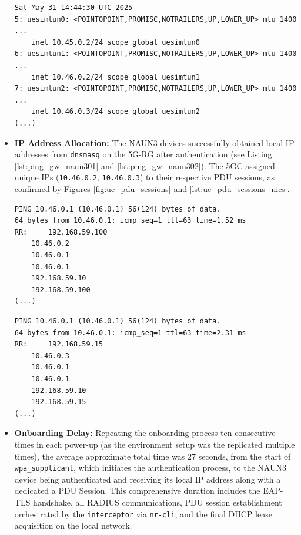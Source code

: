 \begin{itemize}
\begin{lstlisting}[caption=Network interfaces created by UERANSIM to bind to \acs{PDU} Sessions,label={lst:ue_pdu_sessions_nics}]
Sat May 31 14:44:30 UTC 2025
5: uesimtun0: <POINTOPOINT,PROMISC,NOTRAILERS,UP,LOWER_UP> mtu 1400 ...
    inet 10.45.0.2/24 scope global uesimtun0
6: uesimtun1: <POINTOPOINT,PROMISC,NOTRAILERS,UP,LOWER_UP> mtu 1400 ...
    inet 10.46.0.2/24 scope global uesimtun1
7: uesimtun2: <POINTOPOINT,PROMISC,NOTRAILERS,UP,LOWER_UP> mtu 1400 ...
    inet 10.46.0.3/24 scope global uesimtun2
(...)
\end{lstlisting}

    \item \textbf{\ac{IP} Address Allocation:} The \ac{NAUN3} devices successfully obtained local \ac{IP} addresses from \texttt{dnsmasq} on the \ac{5G-RG} after authentication (see Listing \ref{lst:ping_gw_naun301} and \ref{lst:ping_gw_naun302}). The \ac{5GC} assigned unique \acp{IP} (\texttt{10.46.0.2}, \texttt{10.46.0.3}) to their respective \ac{PDU} sessions, as confirmed by Figures \ref{fig:ue_pdu_sessions} and \ref{lst:ue_pdu_sessions_nics}.

\begin{lstlisting}[caption=\texttt{naun301} \texttt{ping -R} displaying route to the \acs{5GC},label={lst:ping_gw_naun301}]
PING 10.46.0.1 (10.46.0.1) 56(124) bytes of data.
64 bytes from 10.46.0.1: icmp_seq=1 ttl=63 time=1.52 ms
RR: 	192.168.59.100
    10.46.0.2
    10.46.0.1
    10.46.0.1
    192.168.59.10
    192.168.59.100
(...)
\end{lstlisting}

\begin{lstlisting}[caption=\texttt{naun3012} \texttt{ping -R} displaying route to the \acs{5GC},label={lst:ping_gw_naun302}]
PING 10.46.0.1 (10.46.0.1) 56(124) bytes of data.
64 bytes from 10.46.0.1: icmp_seq=1 ttl=63 time=2.31 ms
RR: 	192.168.59.15
    10.46.0.3
    10.46.0.1
    10.46.0.1
    192.168.59.10
    192.168.59.15
(...)
\end{lstlisting}

    \item \textbf{Onboarding Delay:} Repeating the onboarding process ten consecutive times in each power-up (as the environment setup was the replicated multiple times), the average approximate total time was 27 seconds, from the start of \texttt{wpa\_supplicant}, which initiates the authentication process, to the \ac{NAUN3} device being authenticated and receiving its local \ac{IP} address along with a dedicated a \ac{PDU} Session. This comprehensive duration includes the \ac{EAP-TLS} handshake, all \ac{RADIUS} communications, \ac{PDU} session establishment orchestrated by the \texttt{interceptor} via \texttt{nr-cli}, and the final \ac{DHCP} lease acquisition on the local network.
\end{itemize}

